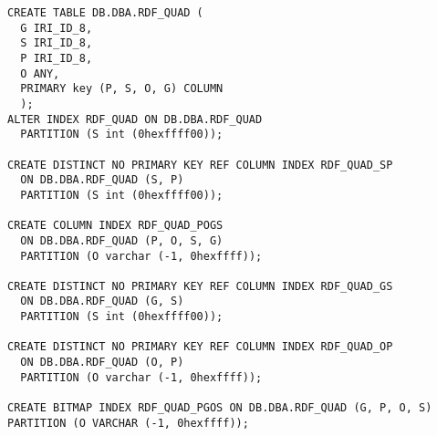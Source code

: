 \begin{siderules}
\begin{verbatim}
CREATE TABLE DB.DBA.RDF_QUAD (
  G IRI_ID_8,
  S IRI_ID_8,
  P IRI_ID_8,
  O ANY,
  PRIMARY key (P, S, O, G) COLUMN
  );
ALTER INDEX RDF_QUAD ON DB.DBA.RDF_QUAD
  PARTITION (S int (0hexffff00));

CREATE DISTINCT NO PRIMARY KEY REF COLUMN INDEX RDF_QUAD_SP
  ON DB.DBA.RDF_QUAD (S, P)
  PARTITION (S int (0hexffff00));

CREATE COLUMN INDEX RDF_QUAD_POGS
  ON DB.DBA.RDF_QUAD (P, O, S, G)
  PARTITION (O varchar (-1, 0hexffff));

CREATE DISTINCT NO PRIMARY KEY REF COLUMN INDEX RDF_QUAD_GS
  ON DB.DBA.RDF_QUAD (G, S)
  PARTITION (S int (0hexffff00));

CREATE DISTINCT NO PRIMARY KEY REF COLUMN INDEX RDF_QUAD_OP
  ON DB.DBA.RDF_QUAD (O, P)
  PARTITION (O varchar (-1, 0hexffff));

CREATE BITMAP INDEX RDF_QUAD_PGOS ON DB.DBA.RDF_QUAD (G, P, O, S)
PARTITION (O VARCHAR (-1, 0hexffff));
\end{verbatim}
\end{siderules}